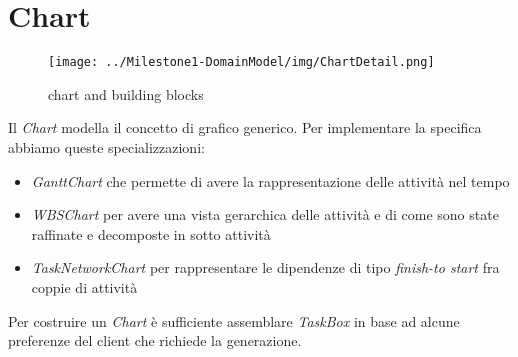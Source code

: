 \section{Chart}
\label{sec:chart}

\begin{figure}[h!] 
	\centering
	\texttt{[image: ../Milestone1-DomainModel/img/ChartDetail.png]}
	\caption{chart and building blocks}
	\label{fig:chart} 
\end{figure}

Il \emph{Chart} modella il concetto di grafico generico. Per implementare la
specifica abbiamo queste specializzazioni:
\begin{itemize}
  \item \emph{GanttChart} che permette di avere la rappresentazione delle
  attivit\`a nel tempo
  \item \emph{WBSChart} per avere una vista gerarchica delle attivit\`a e di
  come sono state raffinate e decomposte in sotto attivit\`a
  \item \emph{TaskNetworkChart} per rappresentare le dipendenze di tipo
  \emph{finish-to start} fra coppie di attivit\`a
\end{itemize}

Per costruire un \emph{Chart} \`e sufficiente assemblare \emph{TaskBox} in base
ad alcune preferenze del client che richiede la generazione.
